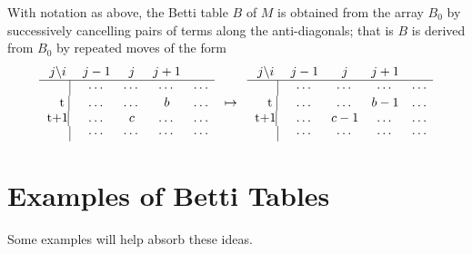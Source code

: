 \begin{proposition}\cite{Peeva}\label{cancellation}
With notation as above, the Betti table $B$ of $M$ is obtained from the array $B_{0}$ by successively cancelling pairs of terms along the anti-diagonals; that is $B$ is derived from $B_{0}$ by repeated moves of the form
\begin{align*}
\begin{matrix}
j \backslash i     &j-1&j&j+1\\ \hline
\text{\kern 19pt}\vline &\cdots&\cdots&\cdots&\cdots\\
\text{ \kern 7pt t }\vline &\dots&\dots&b&\dots\\
\text{t+1}\vline &\dots&c&\dots&\dots\\
\text{\kern 19pt}\vline &\cdots&\cdots&\cdots&\cdots\\
\end{matrix}
\quad \mapsto\quad
\begin{matrix}
j \backslash i     &j-1&j&j+1\\ \hline
\text{\kern 19pt}\vline &\cdots&\cdots&\cdots&\cdots\\
\text{ \kern 7pt t }\vline &\dots&\dots&b-1&\dots\\
\text{t+1}\vline &\dots&c-1&\dots&\dots\\
\text{\kern 19pt}\vline &\cdots&\cdots&\cdots&\cdots\\
\end{matrix}
\end{align*}
\end{proposition}


\section{Examples of Betti Tables}
Some examples will help absorb these ideas.


